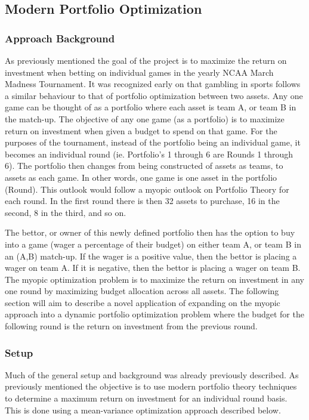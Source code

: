\documentclass[12pt]{article}
\begin{document}
\subsection{Modern Portfolio Optimization}
\subsubsection{Approach Background}
As previously mentioned the goal of the project is to maximize the return on investment when betting on individual games in the yearly NCAA March Madness Tournament.
It was recognized early on that gambling in sports follows a similar behaviour to that of portfolio optimization between two assets. 
Any one game can be thought of as a portfolio where each asset is team A, or team B in the match-up.
The objective of any one game (as a portfolio) is to maximize return on investment when given a budget to spend on that game.
For the purposes of the tournament, instead of the portfolio being an individual game, it becomes an individual round (ie. Portfolio's 1 through 6 are Rounds 1 through 6).
The portfolio then changes from being constructed of assets as teams, to assets as each game.
In other words, one game is one asset in the portfolio (Round).
This outlook would follow a myopic outlook on Portfolio Theory for each round.
In the first round there is then 32 assets to purchase, 16 in the second, 8 in the third, and so on.

The bettor, or owner of this newly defined portfolio then has the option to buy into a game (wager a percentage of their budget) on either team A, or team B in an (A,B) match-up. 
If the wager is a positive value, then the bettor is placing a wager on team A.
If it is negative, then the bettor is placing a wager on team B.
The myopic optimization problem is to maximize the return on investment in any one round by maximizing budget allocation across all assets. 
The following section will aim to describe a novel application of expanding on the myopic approach into a dynamic portfolio optimization problem where the budget for the following round is the return on investment from the previous round.


\subsubsection{Setup}
Much of the general setup and background was already previously described. 
As previously mentioned the objective is to use modern portfolio theory techniques to determine a maximum return on investment for an individual round basis.
This is done using a mean-variance optimization approach described below.
\end{document}
